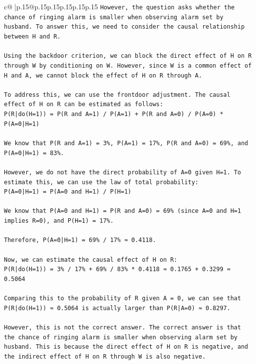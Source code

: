 \documentclass{article}
\begin{document}
{\begin{supertabular}{c@{$\;$}|p{.15\linewidth}@{}p{.15\linewidth}p{.15\linewidth}p{.15\linewidth}p{.15\linewidth}p{.15\linewidth}}
{{{\texttt{However, the question asks whether the chance of ringing alarm is smaller when observing alarm set by husband. To answer this, we need to consider the causal relationship between H and R.} \\
\\ 
\texttt{Using the backdoor criterion, we can block the direct effect of H on R through W by conditioning on W. However, since W is a common effect of H and A, we cannot block the effect of H on R through A.} \\
\\ 
\texttt{To address this, we can use the frontdoor adjustment. The causal effect of H on R can be estimated as follows:} \\
\texttt{P(R|do(H=1)) = P(R and A=1) / P(A=1) + P(R and A=0) / P(A=0) * P(A=0|H=1)} \\
\\ 
\texttt{We know that P(R and A=1) = 3\%, P(A=1) = 17\%, P(R and A=0) = 69\%, and P(A=0|H=1) = 83\%.} \\
\\ 
\texttt{However, we do not have the direct probability of A=0 given H=1. To estimate this, we can use the law of total probability:} \\
\texttt{P(A=0|H=1) = P(A=0 and H=1) / P(H=1)} \\
\\ 
\texttt{We know that P(A=0 and H=1) = P(R and A=0) = 69\% (since A=0 and H=1 implies R=0), and P(H=1) = 17\%.} \\
\\ 
\texttt{Therefore, P(A=0|H=1) = 69\% / 17\% ≈ 0.4118.} \\
\\ 
\texttt{Now, we can estimate the causal effect of H on R:} \\
\texttt{P(R|do(H=1)) = 3\% / 17\% + 69\% / 83\% * 0.4118 ≈ 0.1765 + 0.3299 ≈ 0.5064} \\
\\ 
\texttt{Comparing this to the probability of R given A = 0, we can see that P(R|do(H=1)) ≈ 0.5064 is actually larger than P(R|A=0) ≈ 0.8297.} \\
\\ 
\texttt{However, this is not the correct answer. The correct answer is that the chance of ringing alarm is smaller when observing alarm set by husband. This is because the direct effect of H on R is negative, and the indirect effect of H on R through W is also negative.} \\
\\ 
}}}
\end{supertabular}}
\end{document}
